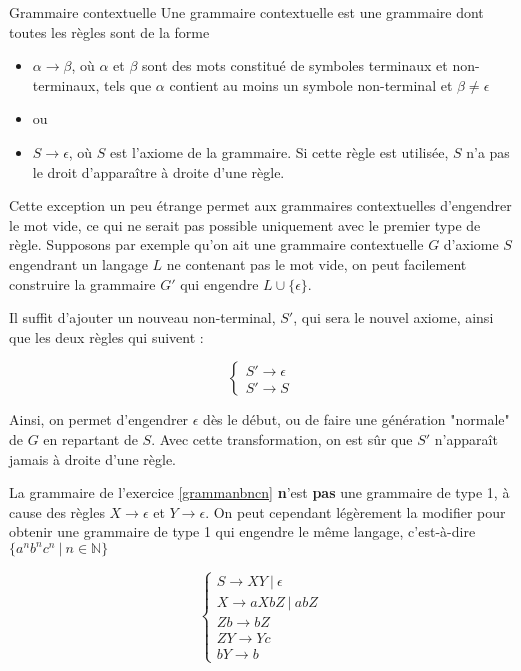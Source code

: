 \begin{definition}{Grammaire contextuelle}{}
Une grammaire contextuelle est une grammaire dont toutes les règles sont de la forme 
\begin{itemize}
\item[] $\alpha \rightarrow \beta$, où $\alpha$ et $\beta$ sont des mots constitué de symboles terminaux et non-terminaux, tels que $\alpha$ contient au moins un symbole non-terminal et $\beta \neq \epsilon$
\item[] ou
\item[] $S \rightarrow \epsilon$, où $S$ est l'axiome de la grammaire. Si cette règle est utilisée, $S$ n'a pas le droit d'apparaître à droite d'une règle.
\end{itemize}

\end{definition}

Cette exception un peu étrange permet aux grammaires contextuelles d'engendrer le mot vide, ce qui ne serait pas possible uniquement avec le premier type de règle. Supposons par exemple qu'on ait une grammaire contextuelle $G$ d'axiome $S$ engendrant un langage $L$ ne contenant pas le mot vide, on peut facilement construire la grammaire $G'$ qui engendre $L \cup \{\epsilon\}$. 

Il suffit d'ajouter un nouveau non-terminal, $S'$, qui sera le nouvel axiome, ainsi que les deux règles qui suivent : 


\[
\begin{cases}
S' \rightarrow \epsilon \\
S' \rightarrow S
\end{cases}
\]

Ainsi, on permet d'engendrer $\epsilon$ dès le début, ou de faire une génération "normale" de $G$ en repartant de $S$. Avec cette transformation, on est sûr que $S'$ n'apparaît jamais à droite d'une règle.

\begin{example}
\label{grammanbncnbis}
La grammaire de l'exercice \ref{grammanbncn} \textbf{n}'est \textbf{pas} une grammaire de type 1, à cause des règles $X \rightarrow \epsilon$ et $Y \rightarrow \epsilon$. On peut cependant légèrement la modifier pour obtenir une grammaire de type 1 qui engendre le même langage, c'est-à-dire $\{a^nb^nc^n ~|~ n \in \mathbb{N}\}$


\[
\begin{cases}
S \rightarrow XY~|~\epsilon \\
X \rightarrow aXbZ~|~abZ\\
Zb \rightarrow bZ \\
ZY \rightarrow Yc \\
bY \rightarrow b
\end{cases}
\]

\end{example}

